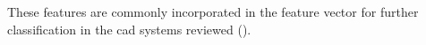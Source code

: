 \begin{enumerate}[leftmargin=*]
%
%
%
These features are commonly incorporated in the feature vector for further classification in the \ac{cad} systems reviewed (\cite{Niaf2011,Niaf2012,Tiwari2009a,Tiwari2010,Tiwari2013,Viswanath2008,Viswanath2011}).


\end{enumerate}
